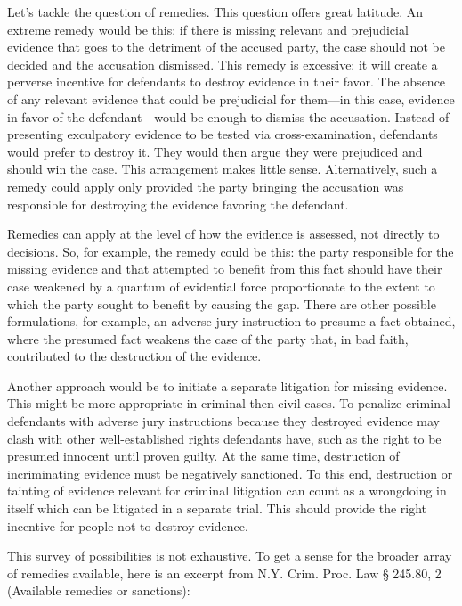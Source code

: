 \documentclass[
  10pt,
  dvipsnames,enabledeprecatedfontcommands]{scrartcl}
\begin{document}
Let's tackle the question of remedies. This question offers great
latitude. An extreme remedy would be this: if there is missing relevant
and prejudicial evidence that goes to the detriment of the accused
party, the case should not be decided and the accusation dismissed. This
remedy is excessive: it will create a perverse incentive for defendants
to destroy evidence in their favor. The absence of any relevant evidence
that could be prejudicial for them---in this case, evidence in favor of
the defendant---would be enough to dismiss the accusation. Instead of
presenting exculpatory evidence to be tested via cross-examination,
defendants would prefer to destroy it. They would then argue they were
prejudiced and should win the case. This arrangement makes little sense.
Alternatively, such a remedy could apply only provided the party
bringing the accusation was responsible for destroying the evidence
favoring the defendant.

Remedies can apply at the level of how the evidence is assessed, not
directly to decisions. So, for example, the remedy could be this: the
party responsible for the missing evidence and that attempted to benefit
from this fact should have their case weakened by a quantum of
evidential force proportionate to the extent to which the party sought
to benefit by causing the gap. There are other possible formulations,
for example, an adverse jury instruction to presume a fact obtained,
where the presumed fact weakens the case of the party that, in bad
faith, contributed to the destruction of the evidence.

Another approach would be to initiate a separate litigation for missing
evidence. This might be more appropriate in criminal then civil cases.
To penalize criminal defendants with adverse jury instructions because
they destroyed evidence may clash with other well-established rights
defendants have, such as the right to be presumed innocent until proven
guilty. At the same time, destruction of incriminating evidence must be
negatively sanctioned. To this end, destruction or tainting of evidence
relevant for criminal litigation can count as a wrongdoing in itself
which can be litigated in a separate trial. This should provide the
right incentive for people not to destroy evidence.

This survey of possibilities is not exhaustive. To get a sense for the
broader array of remedies available, here is an excerpt from N.Y. Crim.
Proc. Law § 245.80, 2 (Available remedies or sanctions):
\end{document}
